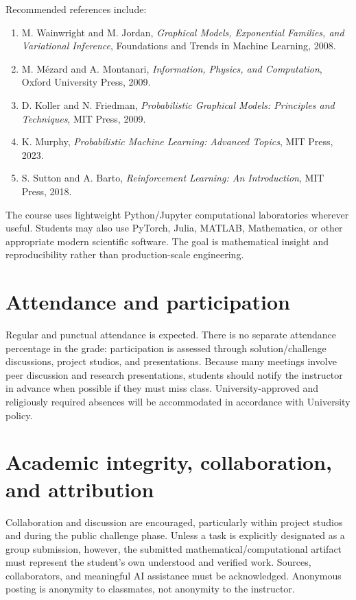 \documentclass[11pt]{article}
\begin{document}
Recommended references include:
\begin{enumerate}
\item M. Wainwright and M. Jordan, \emph{Graphical Models, Exponential Families, and Variational Inference}, Foundations and Trends in Machine Learning, 2008.
\item M. M\'ezard and A. Montanari, \emph{Information, Physics, and Computation}, Oxford University Press, 2009.
\item D. Koller and N. Friedman, \emph{Probabilistic Graphical Models: Principles and Techniques}, MIT Press, 2009.
\item K. Murphy, \emph{Probabilistic Machine Learning: Advanced Topics}, MIT Press, 2023.
\item S. Sutton and A. Barto, \emph{Reinforcement Learning: An Introduction}, MIT Press, 2018.
\end{enumerate}

The course uses lightweight Python/Jupyter computational laboratories wherever useful. Students may also use PyTorch, Julia, MATLAB, Mathematica, or other appropriate modern scientific software. The goal is mathematical insight and reproducibility rather than production-scale engineering.

\section*{Attendance and participation}

Regular and punctual attendance is expected. There is no separate attendance percentage in the grade: participation is assessed through solution/challenge discussions, project studios, and presentations. Because many meetings involve peer discussion and research presentations, students should notify the instructor in advance when possible if they must miss class. University-approved and religiously required absences will be accommodated in accordance with University policy.

\section*{Academic integrity, collaboration, and attribution}

Collaboration and discussion are encouraged, particularly within project studios and during the public challenge phase. Unless a task is explicitly designated as a group submission, however, the submitted mathematical/computational artifact must represent the student's own understood and verified work. Sources, collaborators, and meaningful AI assistance must be acknowledged. Anonymous posting is anonymity to classmates, not anonymity to the instructor.
\end{document}
